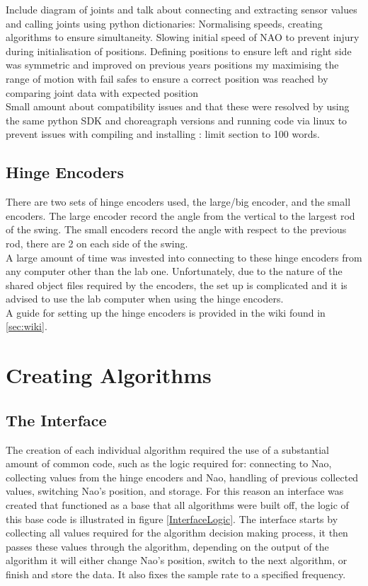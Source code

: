 \documentclass[11pt]{article}
\newcommand*\ruleline[1]{\par\noindent\raisebox{.8ex}{\makebox[\linewidth]{\hrulefill\hspace{1ex}\raisebox{-.8ex}{#1}\hspace{1ex}\hrulefill}}}
\begin{document}
Include diagram of joints and talk about connecting and extracting sensor values and calling joints using python dictionaries:
Normalising speeds, creating algorithms to ensure simultaneity.
Slowing initial speed of NAO to prevent injury during initialisation of positions.
Defining positions to ensure left and right side was symmetric and improved on previous years positions my maximising the range of motion with fail safes to ensure a correct position was reached by comparing joint data with expected position\\

Small amount about compatibility issues and that these were resolved by using the same python SDK and choreagraph versions and running code via linux to prevent issues with compiling and installing : limit section to 100 words.


\subsection{Hinge Encoders}
\ruleline{George Sheppard}
There are two sets of hinge encoders used, the large/big encoder, and the small encoders. The large encoder record the angle from the vertical to the largest rod of the swing. The small encoders record the angle with respect to the previous rod, there are 2 on each side of the swing.\\

A large amount of time was invested into connecting to these hinge encoders from any computer other than the lab one. Unfortunately, due to the nature of the shared object files required by the encoders, the set up is complicated and it is advised to use the lab computer when using the hinge encoders.\\

A guide for setting up the hinge encoders is provided in the wiki found in \ref{sec:wiki}.


\section{Creating Algorithms}

\ruleline{George Sheppard}
\subsection{The Interface}
The creation of each individual algorithm required the use of a substantial amount of common code, such as the logic required for: connecting to Nao, collecting values from the hinge encoders and Nao, handling of previous collected values, switching Nao's position, and storage. For this reason an interface was created that functioned as a base that all algorithms were built off, the logic of this base code is illustrated in figure \ref{InterfaceLogic}. The interface starts by collecting all values required for the algorithm decision making process, it then passes these values through the algorithm, depending on the output of the algorithm it will either change Nao's position, switch to the next algorithm, or finish and store the data. It also fixes the sample rate to a specified frequency.\\
\end{document}
